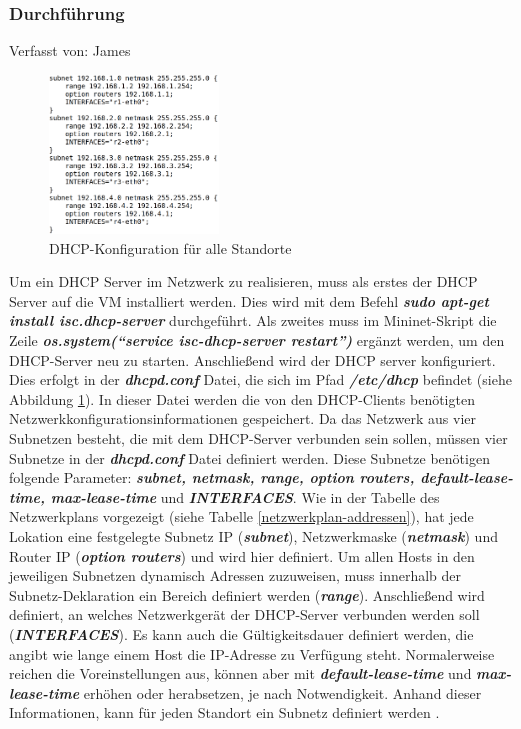 \documentclass[fontsize=12pt,paper=a4,open=any,parskip=half,
  twoside=false,toc=listof,toc=bibliography,fleqn,leqno,
  captions=nooneline,captions=tableabove,british]{scrbook}
\begin{document}
\subsubsection{Durchführung}
{\tiny Verfasst von: James\par}
\begin{figure}
	\vspace{-\baselineskip}
 	\centering
 	\includegraphics[width=0.4\textwidth]{Bilder/dhcp2}
 	\caption{DHCP-Konfiguration für alle Standorte}
 	\label{dhcp2}
\end{figure}
Um ein DHCP Server im Netzwerk zu realisieren, muss als erstes der DHCP Server auf die VM installiert werden. Dies wird mit dem Befehl \textit{\textbf{sudo apt-get install isc.dhcp-server}} durchgeführt. Als zweites muss im Mininet-Skript die Zeile \textit{\textbf{os.system(“service isc-dhcp-server restart”)}} ergänzt werden, um den DHCP-Server neu zu starten. Anschließend wird der DHCP server konfiguriert. Dies erfolgt in der \textit{\textbf{dhcpd.conf}} Datei, die sich im Pfad \textit{\textbf{/etc/dhcp}} befindet (siehe Abbildung \ref{dhcp2}). In dieser Datei werden die von den DHCP-Clients benötigten Netzwerkkonfigurationsinformationen gespeichert. Da das Netzwerk aus vier Subnetzen besteht, die mit dem DHCP-Server verbunden sein sollen, müssen vier Subnetze in der \textit{\textbf{dhcpd.conf}} Datei definiert werden. Diese Subnetze benötigen folgende Parameter: \textit{\textbf{subnet, netmask, range, option routers, default-lease-time, max-lease-time}} und \textit{\textbf{INTERFACES}}. Wie in der Tabelle des Netzwerkplans vorgezeigt (siehe Tabelle \ref{netzwerkplan-addressen}), hat jede Lokation eine festgelegte Subnetz IP (\textit{\textbf{subnet}}), Netzwerkmaske (\textit{\textbf{netmask}}) und Router IP (\textit{\textbf{option routers}}) und wird hier definiert. Um allen Hosts in den jeweiligen Subnetzen dynamisch Adressen zuzuweisen, muss innerhalb der Subnetz-Deklaration ein Bereich definiert werden (\textit{\textbf{range}}). Anschließend wird definiert, an welches Netzwerkgerät der DHCP-Server verbunden werden soll (\textit{\textbf{INTERFACES}}). Es kann auch die Gültigkeitsdauer definiert werden, die angibt wie lange einem Host die IP-Adresse zu Verfügung steht. Normalerweise reichen die Voreinstellungen aus, können aber mit \textit{\textbf{default-lease-time}} und \textit{\textbf{max-lease-time}} erhöhen oder herabsetzen, je nach Notwendigkeit. Anhand dieser Informationen, kann für jeden Standort ein Subnetz definiert werden \cite{dhcpd}. 
\end{document}
